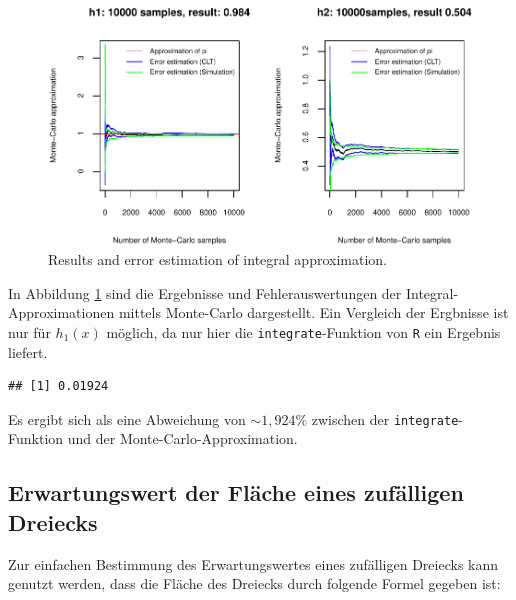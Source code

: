 \documentclass[10pt,]{article}
\newenvironment{Shaded}{\begin{snugshade}}{\end{snugshade}}
\newcommand{\KeywordTok}[1]{\textcolor[rgb]{0.13,0.29,0.53}{\textbf{{#1}}}}
\newcommand{\DecValTok}[1]{\textcolor[rgb]{0.00,0.00,0.81}{{#1}}}
\newcommand{\StringTok}[1]{\textcolor[rgb]{0.31,0.60,0.02}{{#1}}}
\newcommand{\CommentTok}[1]{\textcolor[rgb]{0.56,0.35,0.01}{\textit{{#1}}}}
\newcommand{\NormalTok}[1]{{#1}}
\begin{document}
\begin{figure}[htbp]
\centering
\includegraphics{project1_files/figure-latex/integral monte-carlo-1.pdf}
\caption{Results and error estimation of integral
approximation.\label{fig:plotInt}}
\end{figure}

In Abbildung \ref{fig:plotInt} sind die Ergebnisse und
Fehlerauswertungen der Integral-Approximationen mittels Monte-Carlo
dargestellt. Ein Vergleich der Ergbnisse ist nur für \(h_1(x)\) möglich,
da nur hier die \texttt{integrate}-Funktion von \texttt{R} ein Ergebnis
liefert.

\begin{Shaded}
\end{Shaded}

\begin{verbatim}
## [1] 0.01924
\end{verbatim}

Es ergibt sich als eine Abweichung von \(\sim 1,924\%\) zwischen der
\texttt{integrate}-Funktion und der Monte-Carlo-Approximation.

\subsection{Erwartungswert der Fläche eines zufälligen
Dreiecks}\label{erwartungswert-der-flache-eines-zufalligen-dreiecks}

Zur einfachen Bestimmung des Erwartungswertes eines zufälligen Dreiecks
kann genutzt werden, dass die Fläche des Dreiecks durch folgende Formel
gegeben ist:
\end{document}

